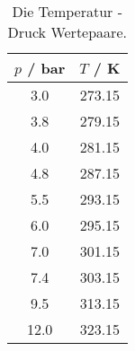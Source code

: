 \begin{table}[!htp]
\centering
\caption{Die Temperatur - Druck Wertepaare.}
\label{tab:temppa}
\begin{tabular}{c c}
\toprule $p$ / bar & $T$ / K \\
\midrule
3.0 & 273.15 \\
3.8 & 279.15 \\
4.0 & 281.15 \\
4.8 & 287.15 \\
5.5 & 293.15 \\
6.0 & 295.15 \\
7.0 & 301.15 \\
7.4 & 303.15 \\
9.5 & 313.15 \\
12.0& 323.15 \\
\bottomrule
\end{tabular}
\end{table}